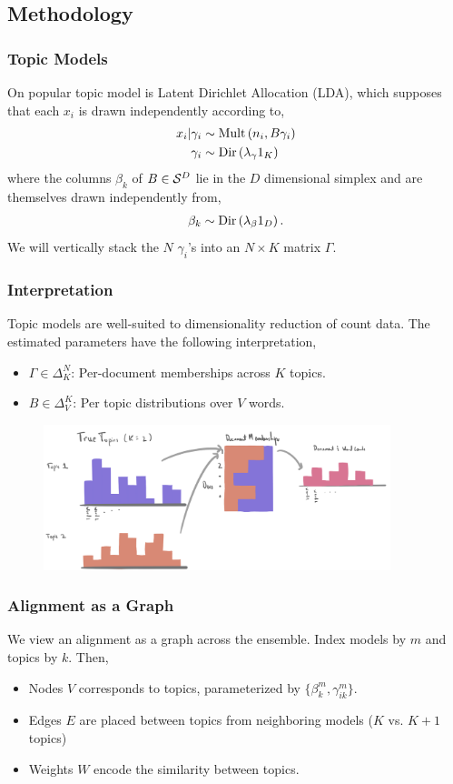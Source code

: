 \documentclass{beamer}
\begin{document}
\subsection{Methodology}

\begin{frame}
  \frametitle{Topic Models}
  On popular topic model is Latent Dirichlet Allocation (LDA), which supposes
  that each $x_{i}$ is drawn independently according to,
  \begin{align*}
  x_i \vert \gamma_i &\sim \text{Mult}\left(n_{i}, B\gamma_{i}\right) \\
  \gamma_{i} &\sim \text{Dir}\left(\lambda_{\gamma} 1_{K}\right)
  \end{align*}
  where the columns $\beta_{k}$ of $B \in \mathcal{S}^{D}$ lie in the $D$
  dimensional simplex and are themselves drawn independently from,
  \begin{align*}
  \beta_{k} \sim \text{Dir}\left(\lambda_{\beta} 1_{D}\right).
\end{align*}
  We will vertically stack the $N$ $\gamma_i$'s into an $N \times K$ matrix
  $\Gamma$.
\end{frame}

\begin{frame}
  \frametitle{Interpretation}
Topic models are well-suited to dimensionality reduction of count data. The
estimated parameters have the following interpretation,
\begin{itemize}
  \item $\Gamma \in \Delta_{K}^{N}$: Per-document memberships across $K$ topics.
  \item $B \in \Delta_{V}^{K}$: Per topic distributions over $V$ words.
\end{itemize}

\begin{figure}
\centering
\includegraphics[width=0.9\textwidth]{lda_overview}
\end{figure}
\end{frame}

\begin{frame}
  \frametitle{Alignment as a Graph}
  We view an alignment as a graph across the ensemble. Index models by $m$ and
  topics by $k$. Then,
  \begin{itemize}
    \item Nodes $V$ corresponds to topics, parameterized by $\{\beta^m_{k},
    \gamma^m_{ik}\}$.
    \item Edges $E$ are placed between topics from neighboring models ($K$ vs.
    $K + 1$ topics)
    \item Weights $W$ encode the similarity between topics.
  \end{itemize}
\end{frame}
\end{document}
